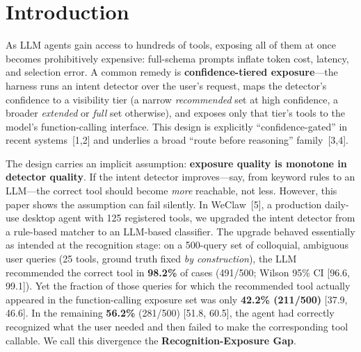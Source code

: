 


\section{Introduction}
\label{sec:intro}

As LLM agents gain access to hundreds of tools, exposing all of them at once becomes prohibitively expensive: full-schema prompts inflate token cost, latency, and selection error. A common remedy is \textbf{confidence-tiered exposure}---the harness runs an intent detector over the user's request, maps the detector's confidence to a visibility tier (a narrow \emph{recommended} set at high confidence, a broader \emph{extended} or \emph{full} set otherwise), and exposes only that tier's tools to the model's function-calling interface. This design is explicitly ``confidence-gated'' in recent systems~[1,2] and underlies a broad ``route before reasoning'' family~[3,4].

The design carries an implicit assumption: \textbf{exposure quality is monotone in detector quality}. If the intent detector improves---say, from keyword rules to an LLM---the correct tool should become \emph{more} reachable, not less. However, this paper shows the assumption can fail silently. In WeClaw~[5], a production daily-use desktop agent with 125 registered tools, we upgraded the intent detector from a rule-based matcher to an LLM-based classifier. The upgrade behaved essentially as intended at the recognition stage: on a 500-query set of colloquial, ambiguous user queries (25 tools, ground truth fixed \emph{by construction}), the LLM recommended the correct tool in \textbf{98.2\%} of cases (491/500; Wilson 95\% CI [96.6, 99.1]). Yet the fraction of those queries for which the recommended tool actually appeared in the function-calling exposure set was only \textbf{42.2\% (211/500)} [37.9, 46.6]. In the remaining \textbf{56.2\%} (281/500) [51.8, 60.5], the agent had correctly recognized what the user needed and then failed to make the corresponding tool callable. We call this divergence the \textbf{Recognition-Exposure Gap}.

